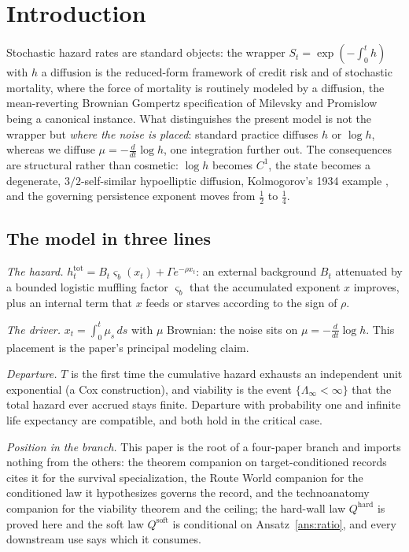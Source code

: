 \documentclass[11pt]{article}
\theoremstyle{definition}
\theoremstyle{remark}
\begin{document}
\section{Introduction}\label{sec:intro}

Stochastic hazard rates are standard objects: the wrapper
$S_t=\exp(-\int_0^t h)$ with $h$ a diffusion is the reduced-form
framework of credit risk \cite{Lan04} and of stochastic mortality,
where the force of mortality is routinely modeled by a diffusion, the
mean-reverting Brownian Gompertz specification of Milevsky and
Promislow \cite{MP01} being a canonical instance. What distinguishes
the present model is not the wrapper but \emph{where the noise is
placed}: standard practice diffuses $h$ or $\log h$, whereas we diffuse
$\mu=-\tfrac{d}{dt}\log h$, one integration further out. The
consequences are structural rather than cosmetic: $\log h$ becomes
$C^1$, the state becomes a degenerate, $3/2$-self-similar hypoelliptic
diffusion, Kolmogorov's 1934 example \cite{Kol34,Hor67}, and the
governing persistence exponent moves from $\tfrac12$ to $\tfrac14$.

\subsection{The model in three lines}
\emph{The hazard.}
$h^{\mathrm{tot}}_t=B_t\varsigma_b(x_t)+\Gamma e^{-\rho x_t}$: an
external background $B_t$ attenuated by a bounded logistic muffling
factor $\varsigma_b$ that the accumulated exponent $x$ improves, plus
an internal term that $x$ feeds or starves according to the sign of
$\rho$.

\emph{The driver.} $x_t=\int_0^t\mu_s\,ds$ with $\mu$ Brownian: the
noise sits on $\mu=-\frac{d}{dt}\log h$. This placement is the paper's
principal modeling claim.

\emph{Departure.} $T$ is the first time the cumulative hazard exhausts
an independent unit exponential (a Cox construction), and viability is
the event $\{\Lambda_\infty<\infty\}$ that the total hazard ever
accrued stays finite. Departure with probability one and infinite life
expectancy are compatible, and both hold in the critical case.

\emph{Position in the branch.} This paper is the root of a four-paper
branch and imports nothing from the others: the theorem companion on
target-conditioned records cites it for the survival specialization,
the Route World companion for the conditioned law it hypothesizes
governs the record, and the technoanatomy companion for the viability
theorem and the ceiling; the hard-wall law $Q^{\mathrm{hard}}$ is
proved here and the soft law $Q^{\mathrm{soft}}$ is conditional on
Ansatz~\ref{ans:ratio}, and every downstream use says which it consumes.
\end{document}
